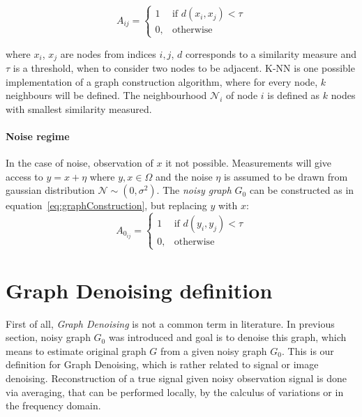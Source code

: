 \begin{equation}
    \label{eq:graphConstruction}
    A_{ij} =    
    \begin{cases}
        1  & \text{if } d(x_i, x_j) < \tau\\
        0, & \text{otherwise}
    \end{cases}
\end{equation}

where $x_i$, $x_j$ are nodes from indices $i,j$, $d$ corresponds to a similarity measure and $\tau$ is a threshold, 
when to consider two nodes to be adjacent.
K-NN is one possible implementation of a graph construction algorithm, 
where for every node, $k$ neighbours will be defined.
The neighbourhood $\mathcal{N}_i$ of node $i$ is defined as $k$ nodes with smallest similarity measured.

\paragraph{Noise regime}
In the case of noise, observation of $x$ it not possible.
Measurements will give access to $y = x + \eta$ where $y,x \in \Omega$ and the noise $\eta$ is assumed to be drawn from gaussian distribution $\mathcal{N} \sim (0,\sigma^2)$.
The \textit{noisy graph} $G_0$ can be constructed as in equation~\ref{eq:graphConstruction}, but replacing $y$ with $x$:
\begin{equation}
    \label{eq:graphConstructionNoise}
    A_{0_{ij}} =    
    \begin{cases}
        1  & \text{if } d(y_i, y_j) < \tau\\
        0, & \text{otherwise}
    \end{cases}
\end{equation}


\section{Graph Denoising definition}

First of all, \textit{Graph Denoising} is not a common term in literature.
In previous section, noisy graph $G_0$ was introduced and goal is to denoise this graph,
which means to estimate original graph $G$ from a given noisy graph $G_0$. 
This is our definition for Graph Denoising, which is rather related to signal or image denoising.
Reconstruction of a true signal given noisy observation signal is done via averaging, that can be performed
locally, by the calculus of variations or in the frequency domain\cite{noneLocalMean}. 

